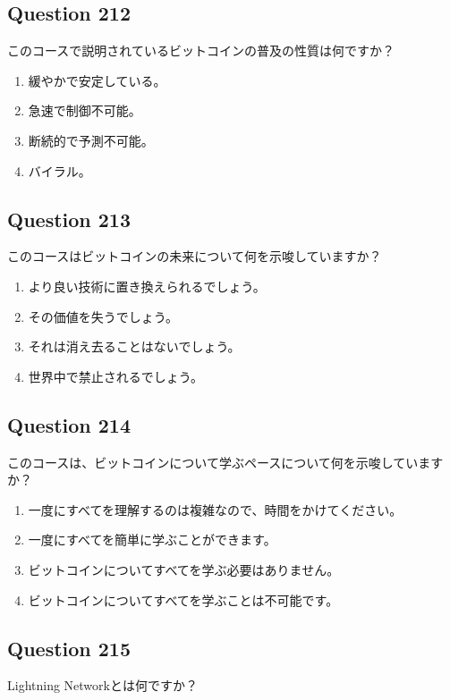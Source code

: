 \documentclass[12pt,a4paper]{article}
\begin{document}
\bigskip


\subsection*{Question 212}
このコースで説明されているビットコインの普及の性質は何ですか？

\begin{enumerate}[label=\Alph*., leftmargin=*]
\item 緩やかで安定している。
\item 急速で制御不可能。
\item 断続的で予測不可能。
\item バイラル。
\end{enumerate}

\bigskip


\subsection*{Question 213}
このコースはビットコインの未来について何を示唆していますか？

\begin{enumerate}[label=\Alph*., leftmargin=*]
\item より良い技術に置き換えられるでしょう。
\item その価値を失うでしょう。
\item それは消え去ることはないでしょう。
\item 世界中で禁止されるでしょう。
\end{enumerate}

\bigskip


\subsection*{Question 214}
このコースは、ビットコインについて学ぶペースについて何を示唆していますか？

\begin{enumerate}[label=\Alph*., leftmargin=*]
\item 一度にすべてを理解するのは複雑なので、時間をかけてください。
\item 一度にすべてを簡単に学ぶことができます。
\item ビットコインについてすべてを学ぶ必要はありません。
\item ビットコインについてすべてを学ぶことは不可能です。
\end{enumerate}

\bigskip


\subsection*{Question 215}
Lightning Networkとは何ですか？
\end{document}
